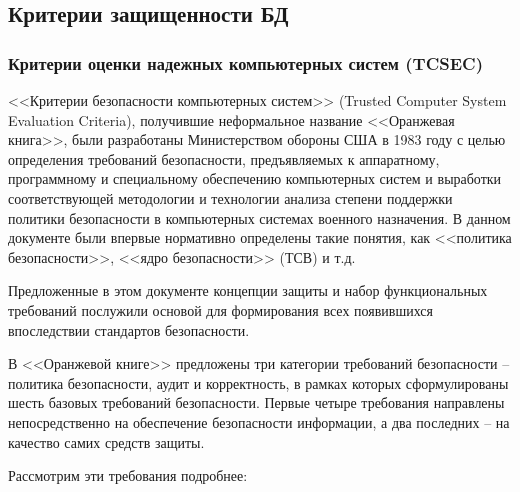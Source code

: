 \subsection{Критерии защищенности БД}

\subsubsection{Критерии оценки надежных компьютерных систем (TCSEC)}
<<Критерии безопасности компьютерных систем>> (Trusted Computer System Evaluation Criteria), получившие неформальное название <<Оранжевая книга>>, были разработаны Министерством обороны США в 1983 году с целью определения требований безопасности, предъявляемых к аппаратному, программному и специальному обеспечению компьютерных систем и выработки соответствующей методологии и технологии анализа степени поддержки политики безопасности в компьютерных системах военного назначения. В данном документе были впервые нормативно определены такие понятия, как <<политика безопасности>>, <<ядро безопасности>> (ТСВ) и т.д.

Предложенные в этом документе концепции защиты и набор функциональных требований послужили основой для формирования всех появившихся впоследствии стандартов безопасности.

В <<Оранжевой книге>> предложены три категории требований безопасности -- политика безопасности, аудит и корректность, в рамках которых сформулированы шесть базовых требований безопасности. Первые четыре требования направлены непосредственно на обеспечение безопасности информации, а два последних -- на качество самих средств защиты.

Рассмотрим эти требования подробнее:


